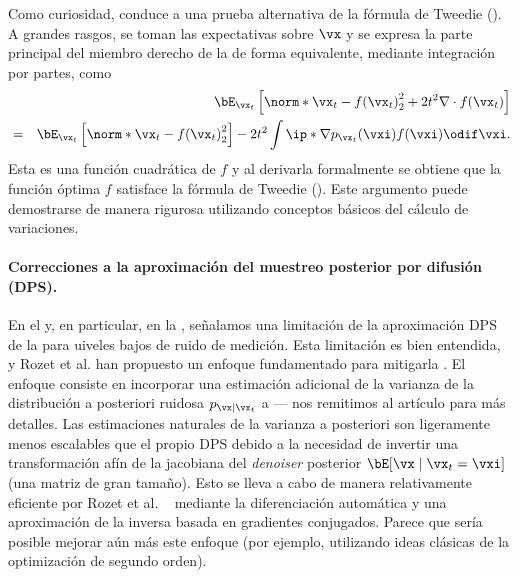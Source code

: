 \documentclass[../../book-main_es.tex]{subfiles}
\begin{document}
Como curiosidad,  conduce a una prueba alternativa
de la fórmula de Tweedie (). A grandes rasgos, se toman
las expectativas sobre $\vx$ y se expresa la parte principal del miembro derecho de la
 de forma equivalente, mediante integración por partes, como
\begin{eqnarray}
    &&\bE_{\vx_t}\left[
        \norm*{\vx_t - f(\vx_t)}_2^2
        + 2t^2 \nabla \cdot f(\vx_t)
    \right] \nonumber \\
    &=&
    \bE_{\vx_t}\left[
        \norm*{\vx_t - f(\vx_t)}_2^2
    \right]
    - 2t^2 \int
    \ip*{\nabla p_{\vx_t}(\vxi)}{f(\vxi)}
    \odif \vxi.
\end{eqnarray}
Esta es una función cuadrática de $f$ y al derivarla formalmente se obtiene
que la función óptima $f$ satisface la fórmula de Tweedie (). Este
argumento puede demostrarse de manera rigurosa utilizando conceptos básicos del cálculo de variaciones.

\paragraph{Correcciones a la aproximación del muestreo posterior por difusión (DPS).}
En el  y, en particular, en la
, señalamos
una limitación de la aproximación DPS de la
 para
uiveles bajos de ruido de medición.
Esta limitación es bien entendida, y Rozet et al. han propuesto un enfoque fundamentado para mitigarla
\cite{rozet2024learning}.
El enfoque consiste en incorporar una estimación adicional de la varianza de
la distribución a posteriori ruidosa $p_{\vx \mid \vx_t}$ a
 --- nos
remitimos al artículo para más detalles.
Las estimaciones naturales de la varianza a posteriori son ligeramente menos escalables que el propio DPS
debido a la necesidad de invertir una transformación afín de la jacobiana del
\textit{denoiser} posterior $\bE[\vx \mid \vx_t=\vxi]$ (una matriz de gran tamaño). Esto se lleva a cabo
de manera relativamente eficiente por Rozet et al. \ \cite{rozet2024learning}
mediante la diferenciación automática y una
aproximación de la inversa basada en gradientes conjugados. Parece que
sería posible mejorar aún más este enfoque (por ejemplo, utilizando ideas clásicas
de la optimización de segundo orden).
\end{document}
